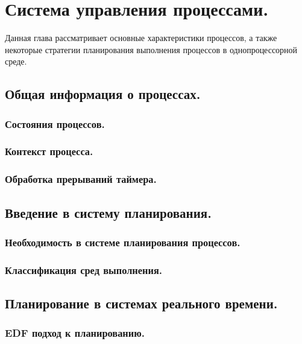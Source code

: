 \newpage
\section[Система управления процессами.]{Система управления процессами.}

Данная глава рассматривает основные характеристики процессов, а также некоторые стратегии планирования выполнения процессов в однопроцессорной среде.

\subsection{Общая информация о процессах.}
\subsubsection{Состояния процессов.}


\subsubsection{Контекст процесса.}


\subsubsection{Обработка прерываний таймера.}

\subsection{Введение в систему планирования.}
\subsubsection{Необходимость в системе планирования процессов.}

\subsubsection{Классификация сред выполнения.}

\subsection{Планирование в системах реального времени.}

\subsubsection{EDF подход к планированию.}


